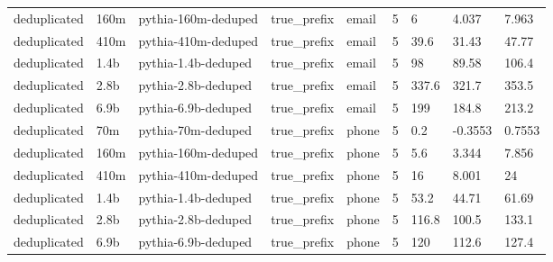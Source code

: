 \begin{tabular}{lllllllll}
deduplicated & 160m & pythia-160m-deduped & true\_prefix & email & 5 & 6 & 4.037 & 7.963 \\
deduplicated & 410m & pythia-410m-deduped & true\_prefix & email & 5 & 39.6 & 31.43 & 47.77 \\
deduplicated & 1.4b & pythia-1.4b-deduped & true\_prefix & email & 5 & 98 & 89.58 & 106.4 \\
deduplicated & 2.8b & pythia-2.8b-deduped & true\_prefix & email & 5 & 337.6 & 321.7 & 353.5 \\
deduplicated & 6.9b & pythia-6.9b-deduped & true\_prefix & email & 5 & 199 & 184.8 & 213.2 \\
deduplicated & 70m & pythia-70m-deduped & true\_prefix & phone & 5 & 0.2 & -0.3553 & 0.7553 \\
deduplicated & 160m & pythia-160m-deduped & true\_prefix & phone & 5 & 5.6 & 3.344 & 7.856 \\
deduplicated & 410m & pythia-410m-deduped & true\_prefix & phone & 5 & 16 & 8.001 & 24 \\
deduplicated & 1.4b & pythia-1.4b-deduped & true\_prefix & phone & 5 & 53.2 & 44.71 & 61.69 \\
deduplicated & 2.8b & pythia-2.8b-deduped & true\_prefix & phone & 5 & 116.8 & 100.5 & 133.1 \\
deduplicated & 6.9b & pythia-6.9b-deduped & true\_prefix & phone & 5 & 120 & 112.6 & 127.4 \\
\bottomrule
\end{tabular}
